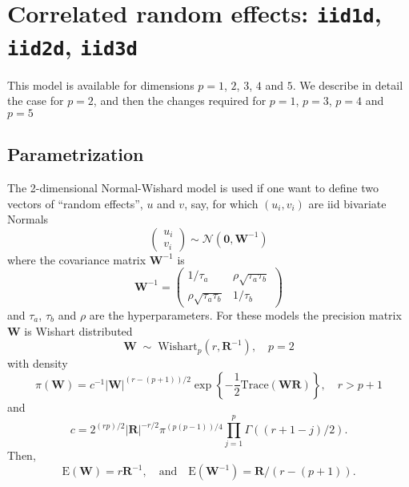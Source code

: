 \documentclass[a4paper,11pt]{article}
\begin{document}
\section*{Correlated random effects: \texttt{iid1d}, \texttt{iid2d},
    \texttt{iid3d}}

This model is available for dimensions $p=1$, $2$, $3$, $4$ and
$5$. We describe in detail the case for $p=2$, and then the changes
required for $p=1$, $p=3$, $p=4$ and $p=5$

\subsection*{Parametrization}

The 2-dimensional Normal-Wishard model is used if one want to define
two vectors of ``random effects'', $u$ and $v$, say, for which
$(u_{i}, v_{i})$ are iid bivariate Normals
\begin{displaymath}
    \left(
      \begin{array}{c}
          u_{i}\\
          v_{i}
      \end{array}\right)
    \sim \mathcal{N}\left(\mathbf{0}, \mathbf{W}^{-1}\right)
\end{displaymath}
where the  covariance matrix $\mathbf{W}^{-1}$ is
\begin{equation}
    \label{precision}
    \mathbf{W}^{-1} = \left(\begin{array}{cc}
          1/\tau_a & \rho \sqrt{\tau_a\tau_b}\\
          \rho\sqrt{\tau_a\tau_b}&  1/\tau_b
      \end{array}\right)
\end{equation}
and $\tau_{a}$, $\tau_{b}$ and $\rho$ are the hyperparameters. For
these models the precision matrix $\mathbf{W}$ is Wishart distributed
\begin{displaymath}
    \mathbf{W}
    \;\sim\;\text{Wishart}_{p}(r, \mathbf{R}^{-1}), \quad p=2
\end{displaymath}
with density
\begin{displaymath}
    \pi(\mathbf{W}) = c^{-1} |\mathbf{W}|^{(r-(p+1))/2} \exp\left\{
      -\frac{1}{2}\text{Trace}(\mathbf{W}\mathbf{R})\right\}, \quad r > p+1
\end{displaymath}
and
\begin{displaymath}
    c = 2^{(rp)/2} |\mathbf{R}|^{-r/2} \pi^{(p(p-1))/4}\prod_{j=1}^{p}
    \Gamma((r+1-j)/2).
\end{displaymath}
Then,
\begin{displaymath}
    \text{E}(\mathbf{W}) = r\mathbf{R}^{-1}, \quad\text{and}\quad
    \text{E}(\mathbf{W}^{-1}) = \mathbf{R}/(r-(p+1)).
\end{displaymath}
\end{document}
